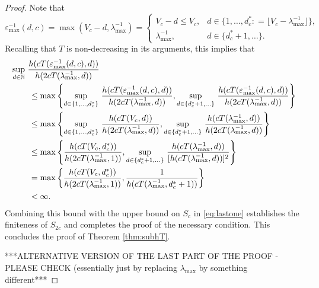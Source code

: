 \documentclass[sort&compress]{elsarticle}
\newcommand{\peter}[1]{\begingroup\color{violet}#1\endgroup}
\begin{document}
\begin{proof}
Note that
\[
\varepsilon^{-1}_{\max}(d,c) = \max(V_c - d,\lambda_{\max}^{-1})
= \begin{cases} V_c - d \le V_c, & d \in \{1, \ldots, d^*_c : = \lfloor V_c - \lambda_{\max}^{-1} \rfloor\}, \\
\lambda_{\max}^{-1}, & d \in \{d^*_c+1, \ldots\}.
\end{cases}
\]
Recalling that $T$ is non-decreasing in its arguments, this implies that
\begin{align*}
    \MoveEqLeft{\sup_{d\in\naturals} \,
		 \frac{ h(cT(\varepsilon^{-1}_{\max}(d,c),d))}{h(2cT(\lambda_{\max}^{-1},d))}}\\
  &\le \max \left \{
  \sup_{d \in \{1, \ldots, d^*_c\}} \,
		 \frac{ h(cT(\varepsilon^{-1}_{\max}(d,c),d))}{h(2cT(\lambda_{\max}^{-1},d))},
  \sup_{d\in \{d^*_c+1, \ldots \}} \,
		 \frac{ h(cT(\varepsilon^{-1}_{\max}(d,c),d))}{h(2cT(\lambda_{\max}^{-1},d))}
  \right \} \\
  & \le \max \left \{
  \sup_{d \in \{1, \ldots, d^*_c\}}  \,
		 \frac{ h(cT(V_c,d))}{h(2cT(\lambda_{\max}^{-1},d))}
  ,
  \sup_{d\in \{d^*_c+1, \ldots \}}  \,
		 \frac{ h(cT(\lambda_{\max}^{-1},d))}{h(2cT(\lambda_{\max}^{-1},d))}
  \right \}
  \\
  & \le \max \left \{
		 \frac{ h(cT(V_c,d^*_c))}{h(2cT(\lambda_{\max}^{-1},1))},
  \sup_{d\in \{d^*_c+1, \ldots \}}  \,
		 \frac{ h(cT(\lambda_{\max}^{-1},d))}{[h(cT(\lambda_{\max}^{-1},d))]^2}
  \right \} \\
  & = \max \left \{
		 \frac{ h(cT(V_c,d^*_c))}{h(2cT(\lambda_{\max}^{-1},1))},
		 \frac{1}{h(cT(\lambda_{\max}^{-1},d_c^*+1))}
  \right \} \\
  & < \infty.
\end{align*}
Combining this bound with the upper bound on $S_c$ in \eqref{eq:lastone} establishes the finiteness of $S_{2c}$ and completes the proof of the necessary condition.
This concludes the proof of Theorem \ref{thm:subhT}.  

\bigskip

\peter{***ALTERNATIVE VERSION OF THE LAST PART OF THE PROOF - PLEASE CHECK (essentially just by replacing $\lambda_{\max}$ by something different***}

\bigskip


\end{proof}
\end{document}

